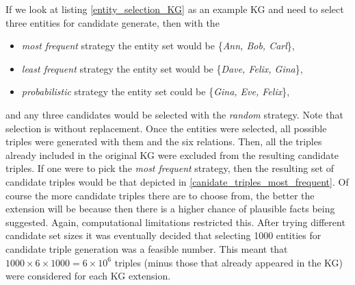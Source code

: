 If we look at listing \ref{entity_selection_KG} as an example KG and need to select three entities for candidate generate, then with the 
\begin{itemize}
    \item \textit{most frequent} strategy the entity set would be \{\textit{Ann, Bob, Carl}\},
    \item \textit{least frequent} strategy the entity set would be \{\textit{Dave, Felix, Gina}\},
    \item \textit{probabilistic} strategy the entity set could be \{\textit{Gina, Eve, Felix}\},
\end{itemize}
and any three candidates would be selected with the \textit{random} strategy. Note that selection is without replacement. Once the entities were selected, all possible triples were generated with them and the six relations. Then, all the triples already included in the original KG were excluded from the resulting candidate triples. If one were to pick the \textit{most frequent} strategy, then the resulting set of candidate triples would be that depicted in \cref{canidate_triples_most_frequent}. Of course the more candidate triples there are to choose from, the better the extension will be because then there is a higher chance of plausible facts being suggested. Again, computational limitations restricted this. After trying different candidate set sizes it was eventually decided that selecting 1000 entities for candidate triple generation was a feasible number. This meant that $ 1000 \times 6 \times 1000 = 6 \times 10^6 $ triples (minus those that already appeared in the KG) were considered for each KG extension.


